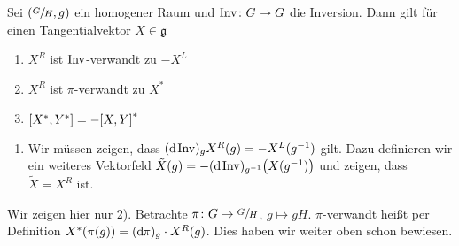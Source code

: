 \begin{lemma}[{name=[Verwandtschaft von Killingvektorfeldern]}]
	Sei $\enbrace*{\sfrac{G}{H},g}$ ein homogener Raum und $\Inv \colon G\to G$ die Inversion.
	Dann gilt für einen Tangentialvektor $X \in \mathfrak{g}$ 
	\begin{enumerate}[1)]
		\item $X^R$ ist $\Inv$-verwandt zu $-X^L$
		\item $X^R$ ist $\pi$-verwandt zu $X^*$
		\item $\benbrace*{X^*,Y^*} = - \benbrace*{X,Y}^*$
	\end{enumerate}
\end{lemma}
\begin{beweis}
	\begin{enumerate}[1)]
		\item Wir müssen zeigen, dass $(\mathd \Inv)_g X^R(g) = - X^L(g^{-1})$ gilt.
		Dazu definieren wir ein weiteres Vektorfeld $\tilde{X}(g) = - (\mathd \Inv)_{g^{-1}} \enbrace*{X(g^{-1})}$ und zeigen, dass $\tilde{X}=X^R$ ist.
	\end{enumerate}
	Wir zeigen hier nur 2).
	Betrachte $\pi \colon G \to \sfrac{G}{H}$, $g \mapsto gH$. 
	$\pi$-verwandt heißt per Definition $X^*(\pi(g)) = (\mathd \pi)_g \cdot X^R(g)$. 
	Dies haben wir weiter oben schon bewiesen.
\end{beweis}


